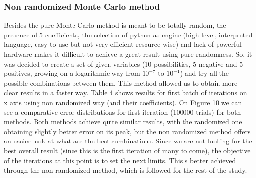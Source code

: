 \documentclass[openany]{article}
\begin{document}
\subsubsection{Non randomized Monte Carlo method}

Besides the pure Monte Carlo method is meant to be totally random, the presence of 5 coefficients, the selection of python as engine (high-level, interpreted language, easy to use but not very efficient resource-wise) and lack of powerful hardware makes it difficult to achieve a great result using pure randomness. So, it was decided to create a set of given variables (10 possibilities, 5 negative and 5 positives, growing on a logarithmic way from \(10^{-7}\) to \(10^{-1}\)) and try all the possible combinations between them. This method allowed us to obtain more clear results in a faster way. Table 4 shows results for first batch of iterations on x axis using non randomized way (and their coefficients). On Figure 10 we can see a comparative error distributions for first iteration (100000 trials) for both methods. Both methods achieve quite similar results, with the randomized one obtaining slightly better error on its peak, but the non randomized method offers an easier look at what are the best combinations. Since we are not looking for the best overall result (since this is the first iteration of many to come), the objective of the iterations at this point is to set the next limits. This s better achieved through the non randomized method, which is followed for the rest of the study.
\end{document}
